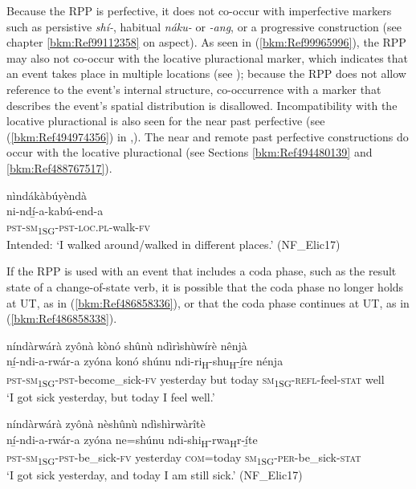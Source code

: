 Because the RPP is perfective, it does not co-occur with imperfective markers such as persistive \textit{shí-}, habitual \textit{náku-} or \textit{-ang}, or a progressive construction (see chapter \ref{bkm:Ref99112358} on aspect). As seen in (\ref{bkm:Ref99965996}), the RPP may also not co-occur with the locative pluractional marker, which indicates that an event takes place in multiple locations (see ); because the RPP does not allow reference to the event’s internal structure, co-occurrence with a marker that describes the event’s spatial distribution is disallowed. Incompatibility with the locative pluractional is also seen for the near past perfective (see (\ref{bkm:Ref494974356}) in ,). The near and remote past perfective constructions do occur with the locative pluractional (see Sections \ref{bkm:Ref494480139} and \ref{bkm:Ref488767517}).

\ea
\label{bkm:Ref99965996}
\glll *nìndákàbúyèndà\\
ni-ndí̲-a-kabú-end-a\\
\textsc{pst}-\textsc{sm}\textsubscript{1SG}-\textsc{pst}-\textsc{loc}.\textsc{pl}-walk-\textsc{fv}\\
\glt Intended: ‘I walked around/walked in different places.’ (NF\_Elic17)
\z

If the RPP is used with an event that includes a coda phase, such as the result state of a change-of-state verb, it is possible that the coda phase no longer holds at UT, as in (\ref{bkm:Ref486858336}), or that the coda phase continues at UT, as in (\ref{bkm:Ref486858338}).

\ea
\label{bkm:Ref486858336}
níndàrwárà zyônà kònó shûnù ndìrìshùwírè nênjà\\
\gll ní̲-ndi-a-rwár-a      zyóna konó  shúnu  ndi-ri\textsubscript{H}-shu\textsubscript{H}-í̲re     nénja\\
\textsc{pst}-\textsc{sm}\textsubscript{1SG}-\textsc{pst}-become\_sick-\textsc{fv}  yesterday
but  today  \textsc{sm}\textsubscript{1SG}-\textsc{refl}-feel-\textsc{stat}  well\\
\glt ‘I got sick yesterday, but today I feel well.’
\z

\ea
\label{bkm:Ref486858338}
níndàrwárà zyônà nèshûnù ndìshìrwàrîtè\\
\gll ní̲-ndi-a-rwár-a    zyóna ne=shúnu  ndi-shi\textsubscript{H}-rwa\textsubscript{H}r-í̲te \\
\textsc{pst}-\textsc{sm}\textsubscript{1SG}-\textsc{pst}-be\_sick-\textsc{fv}  yesterday
\textsc{com}=today  \textsc{sm}\textsubscript{1SG}-\textsc{per}-be\_sick-\textsc{stat}\\
\glt ‘I got sick yesterday, and today I am still sick.’ (NF\_Elic17)
\z

